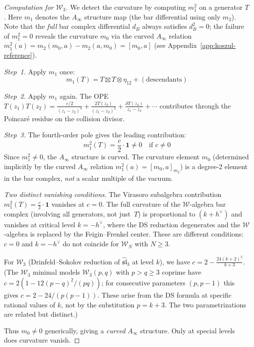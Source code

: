 \begin{proof}[Computation for $\mathcal{W}_3$]
We detect the curvature by computing $m_1^2$ on a generator $T$.  Here $m_1$ denotes the $A_\infty$ structure map (the bar differential using only $m_2$).  Note that the \emph{full} bar complex differential $d_B$ always satisfies $d_B^2 = 0$; the failure of $m_1^2 = 0$ reveals the curvature $m_0$ via the curved $A_\infty$ relation $m_1^2(a) = m_2(m_0, a) - m_2(a, m_0) = [m_0, a]$ (see Appendix~\ref{app:koszul-reference}).

\emph{Step~1.} Apply $m_1$ once:
\begin{equation}
m_1(T) = T \boxtimes T \otimes \eta_{12} + (\text{descendants})
\end{equation}

\emph{Step~2.} Apply $m_1$ again.  The OPE $T(z_1)T(z_2) = \frac{c/2}{(z_1-z_2)^4} + \frac{2T(z_2)}{(z_1-z_2)^2} + \frac{\partial T(z_2)}{z_1-z_2} + \cdots$ contributes through the Poincar\'e residue on the collision divisor.

\emph{Step~3.} The fourth-order pole gives the leading contribution:
\begin{equation}
m_1^2(T) = \frac{c}{2} \cdot \mathbf{1} \neq 0 \quad \text{if } c \neq 0
\end{equation}
Since $m_1^2 \neq 0$, the $A_\infty$ structure is curved.  The curvature element $m_0$ (determined implicitly by the curved $A_\infty$ relation $m_1^2(a) = [m_0, a]_{m_2}$) is a degree-2 element in the bar complex, \emph{not} a scalar multiple of the vacuum.

\emph{Two distinct vanishing conditions.}  The Virasoro subalgebra contribution $m_1^2(T) = \frac{c}{2} \cdot \mathbf{1}$ vanishes at $c = 0$.  The full curvature of the $\mathcal{W}$-algebra bar complex (involving all generators, not just~$T$) is proportional to $(k + h^\vee)$ and vanishes at critical level $k = -h^\vee$, where the DS reduction degenerates and the $\mathcal{W}$-algebra is replaced by the Feigin--Frenkel center.  These are different conditions: $c = 0$ and $k = -h^\vee$ do not coincide for $\mathcal{W}_N$ with $N \geq 3$.

For $\mathcal{W}_3$ (Drinfeld--Sokolov reduction of $\widehat{\mathfrak{sl}}_3$ at level $k$), we have $c = 2 - \frac{24(k+2)^2}{k+3}$.  (The $\mathcal{W}_3$ minimal models $\mathcal{W}_3(p,q)$ with $p > q \geq 3$ coprime have $c = 2(1 - 12(p-q)^2/(pq))$; for consecutive parameters $(p, p-1)$ this gives $c = 2 - 24/(p(p-1))$.  These arise from the DS formula at specific rational values of $k$, not by the substitution $p = k+3$.  The two parametrizations are related but distinct.)

Thus $m_0 \neq 0$ generically, giving a \emph{curved} $A_\infty$ structure. Only at special levels does curvature vanish.
\end{proof}

